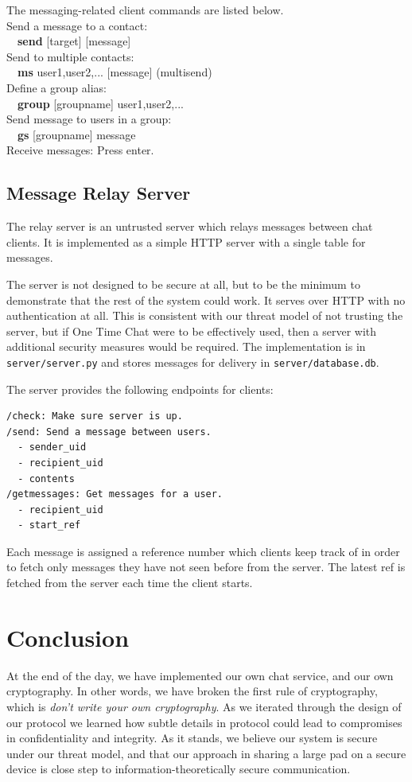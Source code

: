 \documentclass[twocolumn]{article}
\begin{document}
The messaging-related client commands are listed below.\\
Send a message to a contact:\\
\-\ \-\ \textbf{send} [target] [message]\\
Send to multiple contacts:\\
\-\ \-\ \textbf{ms} user1,user2,... [message] (multisend)\\
Define a group alias:\\
\-\ \-\ \textbf{group} [groupname] user1,user2,...\\
Send message to users in a group:\\
\-\ \-\ \textbf{gs} [groupname] message\\
Receive messages:
Press enter.

\subsection{Message Relay Server}
The relay server is an untrusted server which relays messages between chat clients.
It is implemented as a simple HTTP server with a single table for messages.

The server is not designed to be secure at all, but to be the minimum to demonstrate that
the rest of the system could work. It serves over HTTP with no authentication at all.
This is consistent with our threat model of not trusting the server, but if One Time Chat were to be effectively used, then a server with additional security measures would be required. The implementation is in \texttt{server/server.py} and stores messages for delivery in \texttt{server/database.db}.

The server provides the following endpoints for clients:
\begin{lstlisting}
/check: Make sure server is up.
/send: Send a message between users.
  - sender_uid
  - recipient_uid
  - contents
/getmessages: Get messages for a user.
  - recipient_uid
  - start_ref
\end{lstlisting}

Each message is assigned a reference number which clients keep track of in order
to fetch only messages they have not seen before from the server.
The latest ref is fetched from the server each time the client starts.

\section{Conclusion}
At the end of the day, we have implemented our own chat service, and our own cryptography. In other words, we have broken the first rule of cryptography, which is \emph{don't write your own cryptography}. As we iterated through the design of our protocol we learned how subtle details in protocol could lead to compromises in confidentiality and integrity. As it stands, we believe our system is secure under our threat model, and that our approach in sharing a large pad on a secure device is close step to information-theoretically secure communication.

\end{document}
